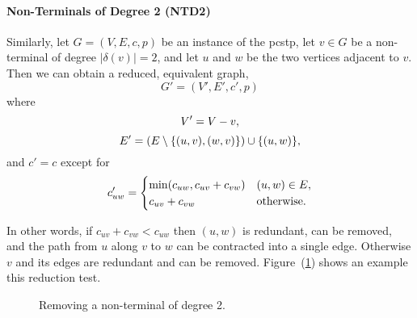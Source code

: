  \paragraph{Non-Terminals of Degree 2 (NTD2)}
    \label{fig:red:test2}
    Similarly, let $G = (V,E,c,p)$ be an instance of the \gls{pcstp}, let $v \in G$ be a non-terminal of degree $|\delta(v)| = 2$, and let
    $u$ and $w$ be the two vertices adjacent to $v$. Then we can obtain a reduced, equivalent graph,
    $$G' = (V', E', c', p)$$
    where
    $$V' = V - v \mathnormal{,}$$
    $$E' = (E \setminus \{(u,v),(w,v)\}) \cup \{(u,w)\}\mathnormal{,}$$
    and $c' = c$ except for
    $$c'_{uw} =
    \begin{cases}
      \min(c_{uw}, c_{uv} + c_{vw}) & (u,w) \in E\mathnormal{,} \\
      c_{uv} + c_{vw} & \text{otherwise.}
    \end{cases}$$

    In other words, if $c_{uv} + c_{vw} <  c_{uw}$ then $(u,w)$ is redundant, can be removed,
    and the path from $u$ along $v$ to $w$
    can be contracted into a single edge.
    Otherwise $v$ and its edges are redundant and can be removed. Figure~(\ref{fig:pre:ntd2})
    shows an example this reduction test.

\begin{figure}[h!]\centering
  \caption{Removing a non-terminal of degree 2.}  \label{fig:pre:ntd2}
\end{figure}

